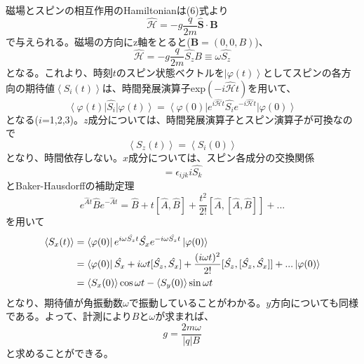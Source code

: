 磁場とスピンの相互作用のHamiltonianは(6)式より
\begin{equation}
\mathcal{\hat{H}}=-g\frac{q}{2m}\bm{\hat{S}}\cdot\bm{B}
\end{equation}
で与えられる。磁場の方向にz軸をとると($\bm{B}=(0,0,B)$)、
\begin{equation}
\mathcal{\hat{H}}=-g\frac{q}{2m}\hat{S_z}{B}\equiv\omega\hat{S_z}
\end{equation}
となる。これより、時刻$t$のスピン状態ベクトルを$\left|\varphi(t)\right\rangle$としてスピンの各方向の期待値$\left\langle S_i(t)\right\rangle$は、時間発展演算子exp$(-i\mathcal{\hat{H}}t)$を用いて、
\begin{equation}
\left\langle\varphi(t)\right|\hat{S_i}\left|\varphi(t)\right\rangle=\left\langle\varphi(0)\right|e^{i\mathcal{\hat{H}}t}\hat{S_i}e^{-i\mathcal{\hat{H}}t}\left|\varphi(0)\right\rangle
\end{equation}
となる($i$=1,2,3)。$z$成分については、時間発展演算子とスピン演算子が可換なので
\begin{equation}
\left\langle S_z(t)\right\rangle=\left\langle S_i(0)\right\rangle
\end{equation}
となり、時間依存しない。$x$成分については、スピン各成分の交換関係
\begin{equation}
[\hat{S_i},\hat{S_j}]=\epsilon_{ijk}i\hat{S_k}
\end{equation}
とBaker-Hausdorffの補助定理
\begin{equation}
e^{\hat{A}t}\hat{B}e^{-\hat{A}t}=\hat{B}+t[\hat{A},\hat{B}]+\frac{t^2}{2!}[\hat{A},[\hat{A},\hat{B}]]+...
\end{equation}
を用いて
\begin{align}
\left\langle S_x(t)\right\rangle &=\left\langle\varphi(0)\right|e^{i\omega\hat{S_z}t}\hat{S_x}e^{-i\omega\hat{S_z}t}\left|\varphi(0)\right\rangle\notag\\&=\left\langle\varphi(0)\right|\hat{S_x}+i\omega t[\hat{S_z},\hat{S_x}]+\frac{(i\omega t)^2}{2!}[\hat{S_z},[\hat{S_z},\hat{S_x}]]+...\left|\varphi(0)\right\rangle\notag\\&=\left\langle S_x(0)\right\rangle\cos\omega t-\left\langle S_y(0)\right\rangle\sin\omega t
\end{align}
となり、期待値が角振動数$\omega$で振動していることがわかる。$y$方向についても同様である。よって、計測により$B$と$\omega$が求まれば、
\begin{equation}
g=\frac{2m\omega}{|q|B}
\end{equation}
と求めることができる。
